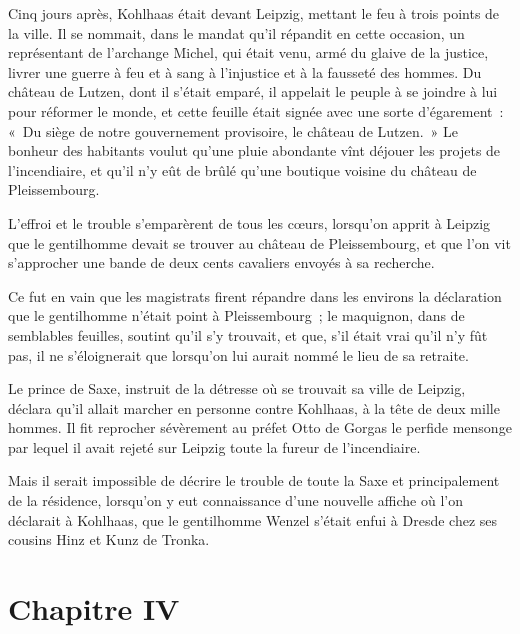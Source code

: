 \documentclass[french,twoside]{book} %
\newcommand\chapteropen{} %
\newcommand\chapterclose{} %
\begin{document}
Cinq jours après, Kohlhaas était devant Leipzig, mettant le feu à trois points de la ville. Il se nommait, dans le mandat qu’il répandit en cette occasion, un représentant de l’archange Michel, qui était venu, armé du glaive de la justice, livrer une guerre à feu et à sang à l’injustice et à la fausseté des hommes. Du château de Lutzen, dont il s’était emparé, il appelait le peuple à se joindre à lui pour réformer le monde, et cette feuille était signée avec une sorte d’égarement : « Du siège de notre gouvernement provisoire, le château de Lutzen. » Le bonheur des habitants voulut qu’une pluie abondante vînt déjouer les projets de l’incendiaire, et qu’il n’y eût de brûlé qu’une boutique voisine du château de Pleissembourg.\par
L’effroi et le trouble s’emparèrent de tous les cœurs, lorsqu’on apprit à Leipzig que le gentilhomme devait se trouver au château de Pleissembourg, et que l’on vit s’approcher une bande de deux cents cavaliers envoyés à sa recherche.\par
Ce fut en vain que les magistrats firent répandre dans les environs la déclaration que le gentilhomme n’était point à Pleissembourg ; le maquignon, dans de semblables feuilles, soutint qu’il s’y trouvait, et que, s’il était vrai qu’il n’y fût pas, il ne s’éloignerait que lorsqu’on lui aurait nommé le lieu de sa retraite.\par
Le prince de Saxe, instruit de la détresse où se trouvait sa ville de Leipzig, déclara qu’il allait marcher en personne contre Kohlhaas, à la tête de deux mille hommes. Il fit reprocher sévèrement au préfet Otto de Gorgas le perfide mensonge par lequel il avait rejeté sur Leipzig toute la fureur de l’incendiaire.\par
Mais il serait impossible de décrire le trouble de toute la Saxe et principalement de la résidence, lorsqu’on y eut connaissance d’une nouvelle affiche où l’on déclarait à Kohlhaas, que le gentilhomme Wenzel s’était enfui à Dresde chez ses cousins Hinz et Kunz de Tronka.
\chapterclose


\chapteropen
\chapter[Chapitre IV]{Chapitre IV}\renewcommand{\leftmark}{Chapitre IV}
\end{document}
